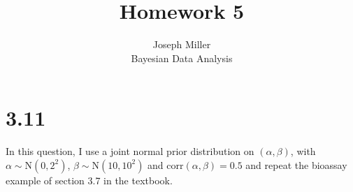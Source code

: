 \documentclass[12pt]{article}
\begin{document}
 
 
\title{Homework 5}
\author{Joseph Miller\\
Bayesian Data Analysis} 
 
\maketitle
 
\section*{3.11} In this question, I use a joint normal prior distribution on $(\alpha, \beta)$, with $\alpha \sim \text{N}(0,2^2)$, $\beta \sim \text{N}(10,10^2)$ and corr$(\alpha, \beta)=0.5$ and repeat the bioassay example of section 3.7 in the textbook.
\end{document}
